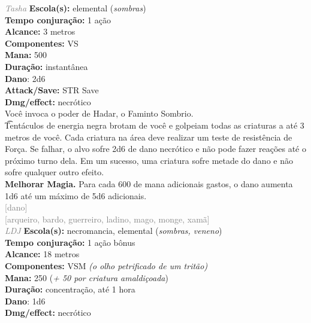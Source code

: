 \documentclass{RPG_Adventure}[2021/10/20]
\begin{document}
{\tiny \textcolor{gray}{\textit{Tasha}}}\jump{}
{\small \t \textbf{Escola(s):} elemental (\textit{sombras})\\\t \textbf{Tempo conjuração:} 1 ação\\\t \textbf{Alcance:} 3 metros\\\t \textbf{Componentes:} VS\\\t \textbf{Mana:} 500\\\t \textbf{Duração:} instantânea\\\t \textbf{Dano}: 2d6\\\t \textbf{Attack/Save:} STR Save\\\t \textbf{Dmg/effect:} necrótico\\}
{\normalsize Você invoca o poder de Hadar, o Faminto Sombrio.\\\t Tentáculos de energia negra brotam de você e golpeiam todas as criaturas a até 3 metros de você. Cada criatura na área deve realizar um teste de resistência de Força. Se falhar, o alvo sofre 2d6 de dano necrótico e não pode fazer reações até o próximo turno dela. Em um sucesso, uma criatura sofre metade do dano e não sofre qualquer outro efeito.\\\t \textbf{Melhorar Magia.} Para cada 600 de mana adicionais gastos, o dano aumenta 1d6 até um máximo de 5d6 adicionais.\\}
{\scriptsize \textcolor{gray}{[dano]\\}}
{\scriptsize \textcolor{gray}{[arqueiro, bardo, guerreiro, ladino, mago, monge, xamã]\\}}
{\tiny \textcolor{gray}{\textit{LDJ}}}\jump{}
{\small \t \textbf{Escola(s):} necromancia, elemental (\textit{sombras, veneno})\\\t \textbf{Tempo conjuração:} 1 ação bônus\\\t \textbf{Alcance:} 18 metros\\\t \textbf{Componentes:} VSM \textit{(o olho petrificado de um tritão)}\\\t \textbf{Mana:} 250 (\textit{+ 50 por criatura amaldiçoada})\\\t \textbf{Duração:} concentração, até 1 hora\\\t \textbf{Dano}: 1d6\\\t \textbf{Dmg/effect:} necrótico\\}
\end{document}
